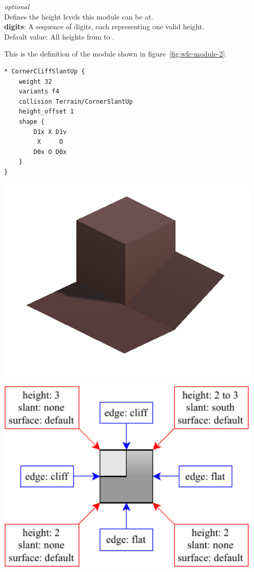 \emph{optional}\\
Defines the height levels this module can be at.\\
\textbf{digits}: A sequence of digits, each representing one valid height.\\
Default value: All heights from  to .

This is the definition of the module shown in figure~\ref{fig:wfc-module-2}.
\begin{verbatim}
* CornerCliffSlantUp {
    weight 32
    variants f4
    collision Terrain/CornerSlantUp
    height_offset 1
    shape {
        D1x X D1v
         X     O
        D0x O D0x
    }
}
\end{verbatim}

\begin{center}
    \captionsetup{type=figure}
    \begin{minipage}{.5\textwidth}
        \centering
        \includegraphics[width=0.95\textwidth]{img/Module model.png}
    \end{minipage}%
    \begin{minipage}{.5\textwidth}
        \centering
        \includegraphics[width=0.95\textwidth]{img/Module constraints.pdf}

\end{minipage}
\end{center}
